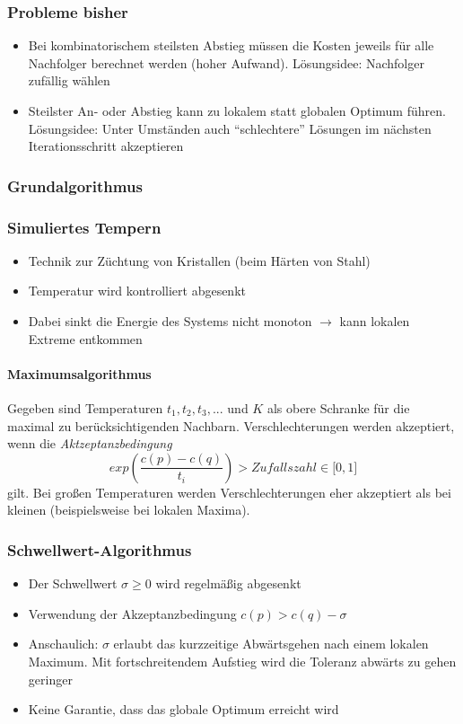 \subsubsection{Probleme bisher}
\begin{itemize}
	\item Bei kombinatorischem steilsten Abstieg müssen die Kosten jeweils für alle Nachfolger berechnet werden (hoher Aufwand). Lösungsidee: Nachfolger zufällig wählen
	\item Steilster An- oder Abstieg kann zu lokalem statt globalen Optimum führen. Lösungsidee: Unter Umständen auch "`schlechtere"' Lösungen im nächsten Iterationsschritt akzeptieren
\end{itemize}

\subsubsection{Grundalgorithmus}


\subsubsection{Simuliertes Tempern}
\begin{itemize}
	\item Technik zur Züchtung von Kristallen (beim Härten von Stahl)
	\item Temperatur wird kontrolliert abgesenkt
	\item Dabei sinkt die Energie des Systems nicht monoton \(\rightarrow\) kann lokalen Extreme entkommen
\end{itemize}

\paragraph{Maximumsalgorithmus}
Gegeben sind Temperaturen \(t_1,t_2,t_3,...\) und \(K\) als obere Schranke für die maximal zu berücksichtigenden Nachbarn. Verschlechterungen werden akzeptiert, wenn die \textit{Aktzeptanzbedingung}
\[exp(\frac{c(p)-c(q)}{t_i}) > Zufallszahl \in \lbrack 0,1 \rbrack\]
gilt. Bei großen Temperaturen werden Verschlechterungen eher akzeptiert als bei kleinen (beispielsweise bei lokalen Maxima).
\text{}\\


\subsubsection{Schwellwert-Algorithmus}
\begin{itemize}
	\item Der Schwellwert \(\sigma \geq 0\) wird regelmäßig abgesenkt
	\item Verwendung der Akzeptanzbedingung \(c(p) > c(q) - \sigma\)
	\item Anschaulich: \(\sigma\) erlaubt das kurzzeitige Abwärtsgehen nach einem lokalen Maximum. Mit fortschreitendem Aufstieg wird die Toleranz abwärts zu gehen geringer
	\item Keine Garantie, dass das globale Optimum erreicht wird
\end{itemize}

